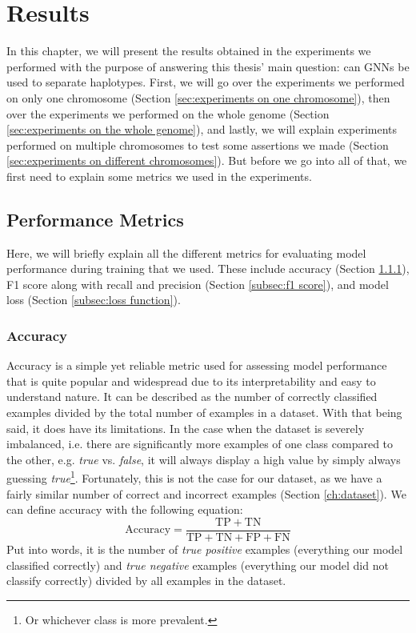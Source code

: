 \documentclass[times, utf8, diplomski, english]{fer_eng}
\begin{document}
\chapter{Results}
\label{ch:results}

In this chapter, we will present the results obtained in the experiments we performed with the purpose of answering this thesis' main question: can GNNs be used to separate haplotypes. First, we will go over the experiments we performed on only one chromosome (Section \ref{sec:experiments on one chromosome}), then over the experiments we performed on the whole genome (Section \ref{sec:experiments on the whole genome}), and lastly, we will explain experiments performed on multiple chromosomes to test some assertions we made (Section \ref{sec:experiments on different chromosomes}). But before we go into all of that, we first need to explain some metrics we used in the experiments.

\section{Performance Metrics}

Here, we will briefly explain all the different metrics for evaluating model performance during training that we used. These include accuracy (Section \ref{subsec:accuracy}), F1 score along with recall and precision (Section \ref{subsec:f1 score}), and model loss (Section \ref{subsec:loss function}).

\subsection{Accuracy}
\label{subsec:accuracy}

Accuracy is a simple yet reliable metric used for assessing model performance that is quite popular and widespread due to its interpretability and easy to understand nature. It can be described as the number of correctly classified examples divided by the total number of examples in a dataset. With that being said, it does have its limitations. In the case when the dataset is severely imbalanced, i.e. there are significantly more examples of one class compared to the other, e.g. \textit{true} vs. \textit{false}, it will always display a high value by simply always guessing \textit{true}\footnote{Or whichever class is more prevalent.}. Fortunately, this is not the case for our dataset, as we have a fairly similar number of correct and incorrect examples (Section \ref{ch:dataset}). We can define accuracy with the following equation:
\[ \mathrm{Accuracy} = \frac{\mathrm{TP} + \mathrm{TN}}{\mathrm{TP} + \mathrm{TN} + \mathrm{FP} + \mathrm{FN}} \]
Put into words, it is the number of \textit{true positive} examples (everything our model classified correctly) and \textit{true negative} examples (everything our model did not classify correctly) divided by all examples in the dataset.
\end{document}

